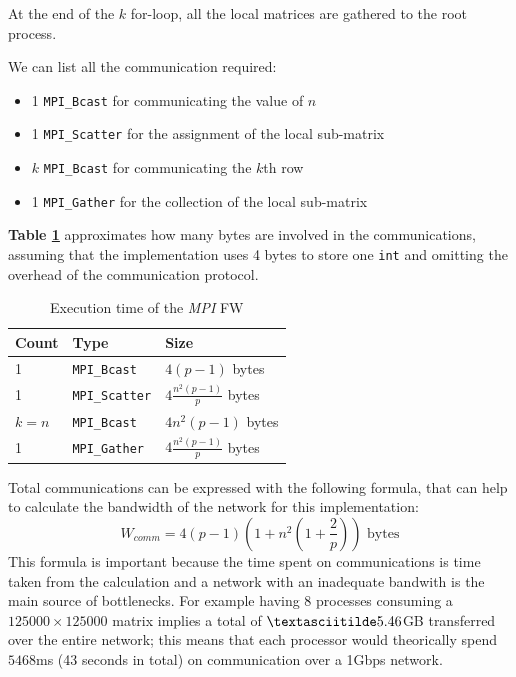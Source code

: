At the end of the $k$ for-loop, all the local matrices are gathered to the root process. \par
We can list all the communication required:
\begin{itemize}
\item{1 \texttt{MPI\_Bcast} for communicating the value of $n$}
\item{1 \texttt{MPI\_Scatter} for the assignment of the local sub-matrix}
\item{$k$ \texttt{MPI\_Bcast} for communicating the $k$th row}
\item{1 \texttt{MPI\_Gather} for the collection of the local sub-matrix}
\end{itemize}

\textbf{Table \ref*{tab:comm}} approximates how many bytes are involved in the communications, assuming that
the implementation uses 4 bytes to store one \texttt{int} and omitting the overhead of the communication protocol.
\begin{table}[h!]
\centering
\begin{tabular}{|l|l|l|}
\hline
\rowcolor[HTML]{F56B00} 
{\color[HTML]{FFFFFF} \textbf{Count}} & {\color[HTML]{FFFFFF} \textbf{Type}} & {\color[HTML]{FFFFFF} \textbf{Size}} \\ \hline
1                                     &  \texttt{MPI\_Bcast}                 &  $4(p-1)$ bytes                      \\ \hline
1                                     &  \texttt{MPI\_Scatter}               &  $4\frac{n^2(p-1)}{p}$ bytes         \\ \hline
$k = n$                               &  \texttt{MPI\_Bcast}                 &  $4n^2(p-1)$ bytes                    \\ \hline
1                                     &  \texttt{MPI\_Gather}                &  $4\frac{n^2(p-1)}{p}$ bytes         \\ \hline
\end{tabular}
\caption{Execution time of the \emph{MPI} FW}                                                                                                                                            
\label{tab:comm}
\end{table}
\par

Total communications can be expressed with the following formula, that can help to calculate the bandwidth of the network
for this implementation:
\[W_{comm} = 4(p-1)(1 + n^2(1 + \frac{2}{p})) \text{ bytes}\]
This formula is important because the time spent on communications is time taken from the calculation and a network with an inadequate
bandwith is the main source of bottlenecks. For example having 8 processes consuming a $125000 \times 125000$ matrix implies a total of
$\textasciitilde 5.46$GB transferred  over the entire network; this means that each processor would theorically spend $5468$ms (43 seconds in total) on communication over a 1Gbps network.


